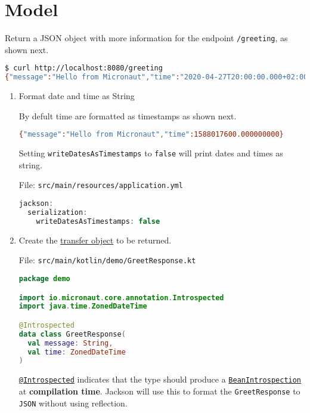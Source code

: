 \section{Model}\label{sec:model}

Return a JSON object with more information for the endpoint \texttt{/greeting}, as shown next.

\begin{lstlisting}[language=bash]
$ curl http://localhost:8080/greeting
{"message":"Hello from Micronaut","time":"2020-04-27T20:00:00.000+02:00"}
\end{lstlisting}

\begin{enumerate}

\item Format date and time as String

By defult time are formatted as timestamps as shown next.

\begin{lstlisting}[language=bash]
{"message":"Hello from Micronaut","time":1588017600.000000000}
\end{lstlisting}

Setting \texttt{writeDatesAsTimestamps} to \texttt{false} will print dates and times as string.

File: \texttt{src/main/resources/application.yml}
\begin{lstlisting}[language=Kotlin]
jackson:
  serialization:
    writeDatesAsTimestamps: false
\end{lstlisting}

\item Create the \href{https://en.wikipedia.org/wiki/Data_transfer_object}{transfer object} to be returned.

File: \texttt{src/main/kotlin/demo/GreetResponse.kt}
\begin{lstlisting}[language=Kotlin]
package demo

import io.micronaut.core.annotation.Introspected
import java.time.ZonedDateTime

@Introspected
data class GreetResponse(
  val message: String,
  val time: ZonedDateTime
)
\end{lstlisting}

\href{https://docs.micronaut.io/2.0.0.M2/api/io/micronaut/core/annotation/Introspected.html}{\texttt{@Introspected}} indicates that the type should produce a \href{https://docs.micronaut.io/2.0.0.M2/api/io/micronaut/core/beans/BeanIntrospection.html}{\texttt{BeanIntrospection}} at \textbf{compilation time}.  Jackson will use this to format the \texttt{GreetResponse} to \texttt{JSON} without using reflection.


\end{enumerate}
